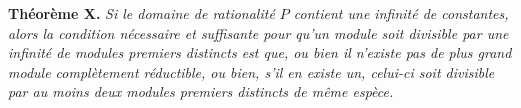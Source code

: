 \textbf{Théorème X.} \emph{Si le domaine de rationalité $P$ contient une infinité de constantes, alors la condition nécessaire et suffisante pour qu'un module soit divisible par une infinité de modules premiers distincts est que, ou bien il n'existe pas de plus grand module complètement réductible, ou bien, s'il en existe un, celui-ci soit divisible par au moins deux modules premiers distincts de même espèce.}
